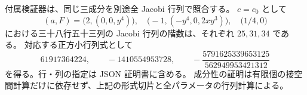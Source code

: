 \begin{remark}[独立した滑らかな点の証明書]
付属検証器は、同じ三成分を別途全 Jacobi 行列で照合する。
$c=c_0$ として
\[
 (a,F)=\bigl(2,(0,0,y^4)\bigr),\quad
 \bigl(-1,(-y^4,0,2xy^3)\bigr),\quad
 \bigl(1/4,0\bigr)
\]
における三十八行五十三列の Jacobi 行列の階数は、それぞれ $25,31,34$ である。
対応する正方小行列式として
\[
 61917364224,\qquad -1410554953728,\qquad
 -\frac{5791625339653125}{562949953421312}
\]
を得る。行・列の指定は JSON 証明書に含める。
成分性の証明は有限個の接空間計算だけに依存せず、上記の形式切片と全パラメータの行列計算による。
\end{remark}
